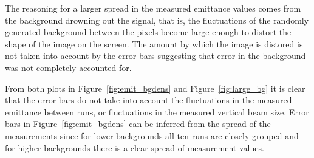 The reasoning for a larger spread in the measured emittance values comes from
the background drowning out the signal, that is, the fluctuations of the
randomly generated background between the pixels become large enough to distort
the shape of the image on the screen. The amount by which the image is distored
is not taken into account by the error bars suggesting that error in the
background was not completely accounted for.


From both plots in Figure~\ref{fig:emit_bgdens} and Figure~\ref{fig:large_bg} it
is clear that the error bars do not take into account the fluctuations in the
measured emittance between runs, or fluctuations in the measured vertical beam
size. Error bars in Figure~\ref{fig:emit_bgdens} can be inferred from the spread
of the measurements since for lower backgrounds all ten runs are closely grouped
and for higher backgrounds there is a clear spread of measurement values.



